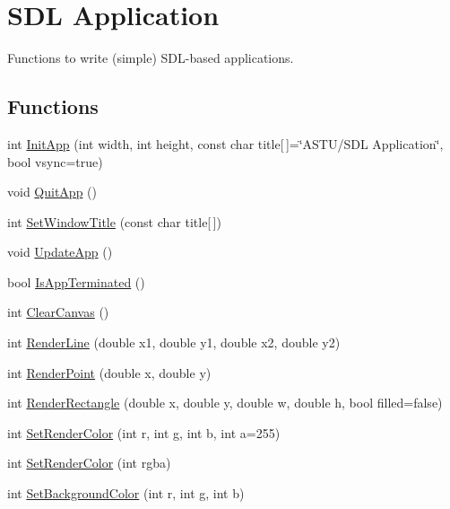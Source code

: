 \hypertarget{group__sdl__group}{}\section{S\+DL Application}
\label{group__sdl__group}


Functions to write (simple) S\+D\+L-\/based applications.  


\subsection*{Functions}
\begin{DoxyCompactItemize}
\item 
int \hyperlink{group__sdl__group_ga8f43e7993cf196bb0af33a60bc93aa75}{Init\+App} (int width, int height, const char title\mbox{[}$\,$\mbox{]}=\char`\"{}A\+S\+TU/S\+DL Application\char`\"{}, bool vsync=true)
\item 
void \hyperlink{group__sdl__group_gaf4cba1685a7c46bccc7bbdf863114cee}{Quit\+App} ()
\item 
int \hyperlink{group__sdl__group_ga6dfd8bbc85eeeee6922576be9ae65e29}{Set\+Window\+Title} (const char title\mbox{[}$\,$\mbox{]})
\item 
void \hyperlink{group__sdl__group_ga9bf9bfe01e7d336c3a3b13cc923ff850}{Update\+App} ()
\item 
bool \hyperlink{group__sdl__group_ga6d29aa641d22a0299da4710022c8c96b}{Is\+App\+Terminated} ()
\item 
int \hyperlink{group__sdl__group_ga4cc0ada571b47d2b809d441fa6766b52}{Clear\+Canvas} ()
\item 
int \hyperlink{group__sdl__group_gade420aec0a7492d5ac5f320b1ff4a814}{Render\+Line} (double x1, double y1, double x2, double y2)
\item 
int \hyperlink{group__sdl__group_gadd510400a2614b9b8fd8afbe368fc795}{Render\+Point} (double x, double y)
\item 
int \hyperlink{group__sdl__group_gaa5b815a9fcac2b1be46a5957bdbfd13f}{Render\+Rectangle} (double x, double y, double w, double h, bool filled=false)
\item 
int \hyperlink{group__sdl__group_gab01fa8f79d94269a5b9a1cb7d2e51843}{Set\+Render\+Color} (int r, int g, int b, int a=255)
\item 
int \hyperlink{group__sdl__group_gaa5ac5769b86fd14f41fc2421e8e029bc}{Set\+Render\+Color} (int rgba)
\item 
int \hyperlink{group__sdl__group_ga540012b7df5eddd0b109543deaa66a22}{Set\+Background\+Color} (int r, int g, int b)

\end{DoxyCompactItemize}
